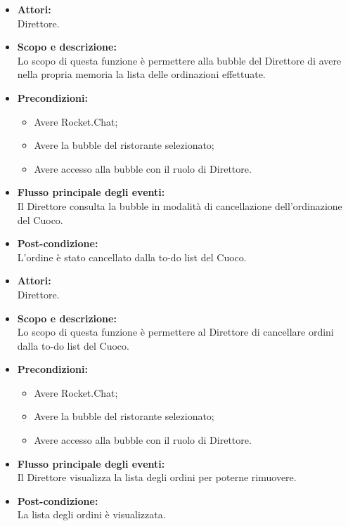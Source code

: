 \begin{itemize}
	\item \textbf{Attori:}
	\\Direttore.
	\item \textbf{Scopo e descrizione:} 
	\\Lo scopo di questa funzione è permettere alla bubble del Direttore di avere nella propria memoria la lista delle ordinazioni effettuate.
	\item \textbf{Precondizioni:}
	\begin{itemize}
		\item Avere Rocket.Chat;
		\item Avere la bubble del ristorante selezionato;
		\item Avere accesso alla bubble con il ruolo di Direttore.
	\end{itemize}
	\item \textbf{Flusso principale degli eventi:}
	\\Il Direttore consulta la bubble in modalità di cancellazione dell'ordinazione del Cuoco.
	\item \textbf{Post-condizione:}
	\\L'ordine è stato cancellato dalla to-do list del Cuoco.
\end{itemize}


\begin{itemize}
	\item \textbf{Attori:}
	\\Direttore.
	\item \textbf{Scopo e descrizione:} 
	\\Lo scopo di questa funzione è permettere al Direttore di cancellare ordini dalla to-do list del Cuoco.
	\item \textbf{Precondizioni:}
	\begin{itemize}
		\item Avere Rocket.Chat;
		\item Avere la bubble del ristorante selezionato;
		\item Avere accesso alla bubble con il ruolo di Direttore.
	\end{itemize}
	\item \textbf{Flusso principale degli eventi:}
	\\Il Direttore visualizza la lista degli ordini per poterne rimuovere.
	\item \textbf{Post-condizione:}
	\\La lista degli ordini è visualizzata.
\end{itemize}

